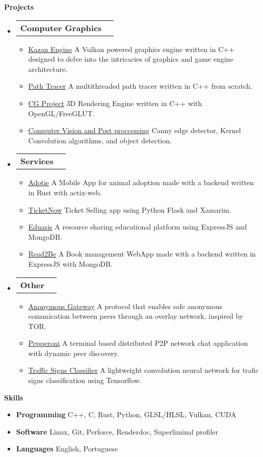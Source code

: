 \documentclass[letterpaper,12pt]{article}[leftmargin=*]
\makeatletter
\def \entryspacing {-0pt}
\renewcommand{\section}[2]{\vspace{5pt}
  \colorbox{secondary}{\color{white}\raggedbottom\normalsize\textbf{{#1}{\hspace{7pt}#2\hspace{7pt}}}}
}
\newcommand{\resumeEntryStart}{\begin{itemize}[leftmargin=2.5mm]}
\newcommand{\resumeEntryEnd}{\end{itemize}\vspace{\entryspacing}}
\newcommand{\resumeItemListStart}{\begin{itemize}[leftmargin=4.5mm]}
\newcommand{\resumeItemListEnd}{\end{itemize}}
\newcommand{\resumeItem}[1]{
  \item\small{
    {#1 \vspace{-2pt}}
  }
}
\newcommand{\resumeEntryTD}[2]{
  \vspace{-1pt}\item[]
    \begin{tabularx}{0.97\textwidth}{X@{\hspace{60pt}}r}
      \textbf{\color{primary}#1} & {\firabook\color{accent}\small#2} \\
    \end{tabularx}\vspace{-6pt}
}
\newcommand{\resumeEntryS}[2]{
  \item[]\small{
    \textbf{\color{primary}#1 }{ #2 \vspace{-6pt}}
  }
}
\makeatother
\begin{document}
\section{}{Projects}

  \resumeEntryStart

    \resumeEntryTD{Computer Graphics}{}
    \resumeItemListStart
      \resumeItem {\underline{Kazan Engine} A Vulkan powered graphics engine written in C++ designed to delve into the intricacies of graphics and game engine architecture.}
      \resumeItem {\underline{Path Tracer} A multithreaded path tracer written in C++ from scratch.}
      \resumeItem {\underline{CG Project} 3D Rendering Engine written in C++ with OpenGL/FreeGLUT.}
      \resumeItem {\underline{Computer Vision and Post proccessing} Canny edge detector, Kernel Convolution algorithms, and object detection.}
    \resumeItemListEnd

    \resumeEntryTD{Services}{}
    \resumeItemListStart
      \resumeItem {\underline{Adotie} A Mobile App for animal adoption made with a backend written in Rust with actix-web.}
      \resumeItem {\underline{TicketNow} Ticket Selling app using Python Flask and Xamarim.}
      \resumeItem {\underline{Eduasis} A resource sharing educational platform using ExpressJS and MongoDB.}
      \resumeItem {\underline{Read2Be} A Book management WebApp made with a backend written in ExpressJS with MongoDB.}
    \resumeItemListEnd

    \resumeEntryTD{Other}{}
    \resumeItemListStart
      \resumeItem {\underline{Anonymous Gateway} A protocol that enables safe anonymous comunication between peers through an overlay network, inspired by TOR.}
      \resumeItem {\underline{Pepperoni} A terminal based distributed P2P network chat application with dynamic peer discovery.}
      \resumeItem {\underline{Traffic Signs Classifier} A lightweight convolution neural network for trafic signs classification using Tensorflow.}
    \resumeItemListEnd

  \resumeEntryEnd

\section{}{Skills}
 \resumeEntryStart
  \resumeEntryS{Programming} {C++, C, Rust, Python, GLSL/HLSL, Vulkan, CUDA}
  \resumeEntryS{Software} {Linux, Git, Perforce, Renderdoc, Superliminal profiler} %
  \resumeEntryS{Languages} {English, Portuguese}
 \resumeEntryEnd
\end{document}
